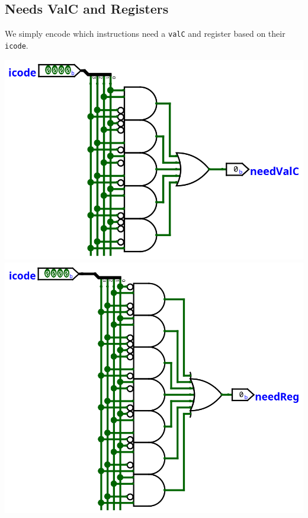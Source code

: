 \documentclass{article}
\begin{document}
\subsection{Needs ValC and Registers}
We simply encode which instructions need a \verb+valC+ and register based on their \verb+icode+. 
\begin{center}
    \includegraphics[scale=.6]{needsValC.png}
    \includegraphics[scale=.6]{needsReg.png}
\end{center}
\end{document}
